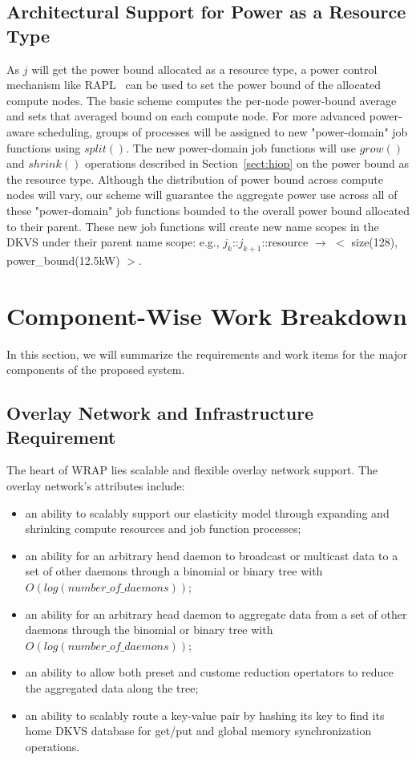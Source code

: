 \documentclass[10pt]{article}
\begin{document}
\subsection{Architectural Support for Power as a Resource Type} 
As $j$ will get the power bound allocated as a resource type, 
a power control mechanism like RAPL~\cite{RountreeRAPL} can be used 
to set the power bound of the allocated compute nodes. 
The basic scheme computes the per-node power-bound average 
and sets that averaged bound on each compute node.
For more advanced power-aware scheduling, groups of processes will
be assigned to new "power-domain" job functions using $split()$. 
The new power-domain job functions will use $grow()$ and $shrink()$ 
operations described in Section~\ref{sect:hiop} 
on the power bound as the resource type.
Although the distribution of power bound across compute
nodes will vary, our scheme will guarantee the aggregate power use 
across all of these "power-domain" job functions bounded to the overall power bound 
allocated to their parent. 
These new job functions will create new name scopes 
in the DKVS under their parent name scope: 
e.g., $j_k$::$j_{k+1}$::resource $\rightarrow$ $<$ size(128), power\_bound(12.5kW) $>$.


\section{Component-Wise Work Breakdown}
In this section, we will summarize the requirements and work items for 
the major components of the proposed system. 

\subsection{Overlay Network and Infrastructure Requirement}
The heart of WRAP lies scalable and flexible overlay network support. The overlay network's attributes include:  

\begin{itemize}

\item{an ability to scalably support our elasticity model through expanding and shrinking compute resources and job function processes;}

\item{an ability for an arbitrary head daemon to broadcast or multicast data to a set of other daemons through a binomial or binary tree with $O(log(number\_of\_daemons))$;}

\item{an ability for an arbitrary head daemon to aggregate data from a set of other daemons through the binomial or binary tree with $O(log(number\_of\_daemons))$;}

\item{an ability to allow both preset and custome reduction opertators to reduce the aggregated data along the tree;}

\item{an ability to scalably route a key-value pair by hashing its key to find its home DKVS database for get/put and global memory synchronization operations.}

\end{itemize}
\end{document}
